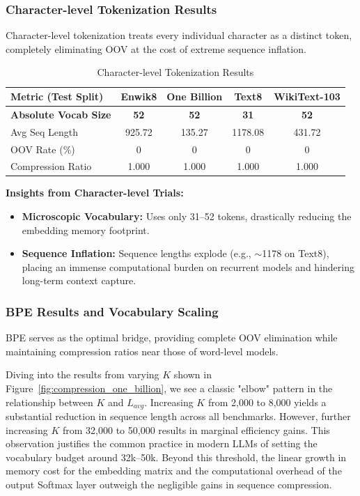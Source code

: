 \subsubsection{Character-level Tokenization Results}
Character-level tokenization treats every individual character as a distinct token, completely eliminating OOV at the cost of extreme sequence inflation.

\begin{table}[H]
\centering
\caption{Character-level Tokenization Results}
\renewcommand{\arraystretch}{1.1}
\begin{tabular}{|l|c|c|c|c|}
\hline
\textbf{Metric (Test Split)} & \textbf{Enwik8} & \textbf{One Billion} & \textbf{Text8} & \textbf{WikiText-103} \\ \hline
\textbf{Absolute Vocab Size} & \textbf{52} & \textbf{52} & \textbf{31} & \textbf{52} \\ \hline
Avg Seq Length & 925.72 & 135.27 & 1178.08 & 431.72 \\ \hline
OOV Rate (\%) & 0 & 0 & 0 & 0 \\ \hline
Compression Ratio & 1.000 & 1.000 & 1.000 & 1.000 \\ \hline
\end{tabular}
\end{table}

\textbf{Insights from Character-level Trials:}
\begin{itemize}
    \item \textbf{Microscopic Vocabulary:} Uses only 31--52 tokens, drastically reducing the embedding memory footprint.
    \item \textbf{Sequence Inflation:} Sequence lengths explode (e.g., $\sim$1178 on Text8), placing an immense computational burden on recurrent models and hindering long-term context capture.
\end{itemize}

\subsubsection{BPE Results and Vocabulary Scaling}
BPE serves as the optimal bridge, providing complete OOV elimination while maintaining compression ratios near those of word-level models.



Diving into the results from varying $K$ shown in Figure~\ref{fig:compression_one_billion}, we see a classic "elbow" pattern in the relationship between $K$ and $L_{avg}$. Increasing $K$ from 2,000 to 8,000 yields a substantial reduction in sequence length across all benchmarks. However, further increasing $K$ from 32,000 to 50,000 results in marginal efficiency gains. This observation justifies the common practice in modern LLMs of setting the vocabulary budget around 32k--50k. Beyond this threshold, the linear growth in memory cost for the embedding matrix and the computational overhead of the output Softmax layer outweigh the negligible gains in sequence compression.


